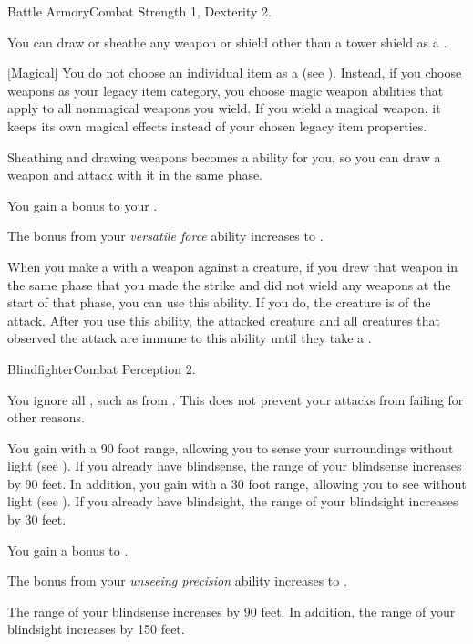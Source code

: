     \begin{feat}{Battle Armory}{Combat}
        \featpre Strength 1, Dexterity 2.

         You can draw or sheathe any weapon or shield other than a tower shield as a .

        [Magical] You do not choose an individual item as a  (see ).
        Instead, if you choose weapons as your legacy item category, you choose magic weapon abilities that apply to all nonmagical weapons you wield.
        If you wield a magical weapon, it keeps its own magical effects instead of your chosen legacy item properties.

         Sheathing and drawing weapons becomes a  ability for you, so you can draw a weapon and attack with it in the same phase.

         You gain a  bonus to your .

         The bonus from your \textit{versatile force} ability increases to .

         When you make a  with a weapon against a creature, if you drew that weapon in the same phase that you made the strike and did not wield any weapons at the start of that phase, you can use this ability.
        If you do, the creature is \unaware of the attack.
        After you use this ability, the attacked creature and all creatures that observed the attack are immune to this ability until they take a .
    \end{feat}

    \begin{feat}{Blindfighter}{Combat}
        \featpre Perception 2.

         You ignore all , such as from .
        This does not prevent your attacks from failing for other reasons.

         You gain  with a 90 foot range, allowing you to sense your surroundings without light (see ).
        If you already have blindsense, the range of your blindsense increases by 90 feet.
        In addition, you gain  with a 30 foot range, allowing you to see without light (see ).
        If you already have blindsight, the range of your blindsight increases by 30 feet.

         You gain a  bonus to .

         The bonus from your \textit{unseeing precision} ability increases to .

         The range of your blindsense increases by 90 feet.
        In addition, the range of your blindsight increases by 150 feet.
    \end{feat}

